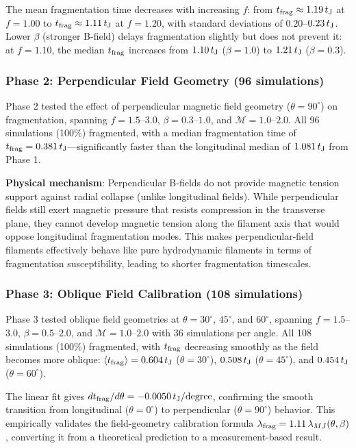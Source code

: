 \documentclass[twocolumn]{mnras}
\begin{document}
The mean fragmentation time decreases with increasing $f$: from $t_{\rm frag} \approx 1.19\,t_{\rm J}$ at $f = 1.00$ to $t_{\rm frag} \approx 1.11\,t_{\rm J}$ at $f = 1.20$, with standard deviations of $0.20$--$0.23\,t_{\rm J}$. Lower $\beta$ (stronger B-field) delays fragmentation slightly but does not prevent it: at $f = 1.10$, the median $t_{\rm frag}$ increases from $1.10\,t_{\rm J}$ ($\beta = 1.0$) to $1.21\,t_{\rm J}$ ($\beta = 0.3$).

\subsubsection{Phase 2: Perpendicular Field Geometry (96 simulations)}

Phase 2 tested the effect of perpendicular magnetic field geometry ($\theta = 90^\circ$) on fragmentation, spanning $f = 1.5$--$3.0$, $\beta = 0.3$--$1.0$, and $\mathcal{M} = 1.0$--$2.0$. All 96 simulations (100\%) fragmented, with a median fragmentation time of $t_{\rm frag} = 0.381\,t_{\rm J}$---significantly faster than the longitudinal median of $1.081\,t_{\rm J}$ from Phase 1.

\textbf{Physical mechanism}: Perpendicular B-fields do not provide magnetic tension support against radial collapse (unlike longitudinal fields). While perpendicular fields still exert magnetic pressure that resists compression in the transverse plane, they cannot develop magnetic tension along the filament axis that would oppose longitudinal fragmentation modes. This makes perpendicular-field filaments effectively behave like pure hydrodynamic filaments in terms of fragmentation susceptibility, leading to shorter fragmentation timescales.

\subsubsection{Phase 3: Oblique Field Calibration (108 simulations)}

Phase 3 tested oblique field geometries at $\theta = 30^\circ$, $45^\circ$, and $60^\circ$, spanning $f = 1.5$--$3.0$, $\beta = 0.5$--$2.0$, and $\mathcal{M} = 1.0$--$2.0$ with 36 simulations per angle. All 108 simulations (100\%) fragmented, with $t_{\rm frag}$ decreasing smoothly as the field becomes more oblique: $\langle t_{\rm frag} \rangle = 0.604\,t_{\rm J}$ ($\theta = 30^\circ$), $0.508\,t_{\rm J}$ ($\theta = 45^\circ$), and $0.454\,t_{\rm J}$ ($\theta = 60^\circ$).

The linear fit gives $dt_{\rm frag}/d\theta = -0.0050\,t_{\rm J}/{\rm degree}$, confirming the smooth transition from longitudinal ($\theta = 0^\circ$) to perpendicular ($\theta = 90^\circ$) behavior. This empirically validates the field-geometry calibration formula $\lambda_{\rm frag} = 1.11\,\lambda_{MJ}(\theta, \beta)$, converting it from a theoretical prediction to a measurement-based result.
\end{document}
